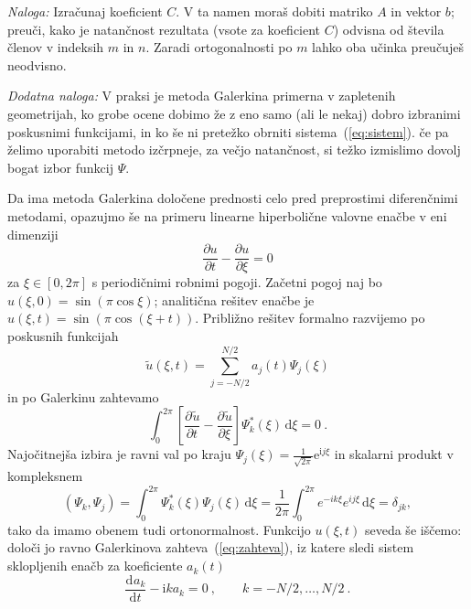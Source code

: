 \documentclass[slovene,11pt,a4paper]{article}
\newcommand{\dd}{\,\mathrm{d}}
\newcommand{\ddd}{\mathrm{d}}
\newcommand{\pd}{\partial}
\newcommand{\Dd}[3][{}]{\frac{\ddd^{#1} #2}{\ddd #3^{#1}}}
\newcommand{\Pd}[3][{}]{\frac{\pd^{#1} #2}{\pd #3^{#1}}}
\begin{document}
\bigskip

{\sl Naloga:} 
Izračunaj koeficient $C$.  V ta namen moraš dobiti matriko $A$
in vektor $b$; preuči, kako je natančnost rezultata
(vsote za koeficient $C$) odvisna od števila členov
v indeksih $m$ in $n$. Zaradi ortogonalnosti
po $m$ lahko oba učinka preučuješ neodvisno.

\bigskip

{\sl Dodatna naloga:}  V praksi je metoda Galerkina primerna
v zapletenih geometrijah, ko grobe ocene dobimo že z eno samo
(ali le nekaj) dobro izbranimi poskusnimi funkcijami,
in ko še ni pretežko obrniti sistema~(\ref{eq:sistem}).
če pa želimo uporabiti metodo izčrpneje,
za večjo natančnost, si težko izmislimo dovolj
bogat izbor funkcij $\Psi$.

Da ima metoda Galerkina določene prednosti celo pred preprostimi
diferenčnimi metodami, opazujmo še na primeru linearne hiperbolične
valovne enačbe v eni dimenziji
\begin{equation*}
  \frac{\partial u}{\partial t} - \frac{\partial u}{\partial \xi} = 0
\end{equation*}
za $\xi \in[0,2\pi]$ s periodičnimi robnimi pogoji.
Začetni pogoj naj bo $u(\xi,0)=\sin(\pi\cos \xi)$;
analitična rešitev enačbe je $u(\xi,t)=\sin(\pi\cos(\xi+t))$.
Približno rešitev formalno razvijemo po poskusnih funkcijah
\begin{equation}
  \widetilde{u}(\xi,t) = \sum_{j=-N/2}^{N/2} a_j(t) \Psi_j(\xi)
  \label{eq:razvoj}
\end{equation}
in po Galerkinu zahtevamo
\begin{equation}
\int_0^{2\pi} \left[ \Pd{\widetilde{u}}{t} -
  \Pd{\widetilde{u}}{\xi} \right] \Psi^*_k(\xi) \dd \xi = 0 \>.
\label{eq:zahteva}
\end{equation}
Najočitnejša izbira je ravni val po kraju $\Psi_j(\xi) = \frac{1}{\sqrt{2\pi}} \mathrm{e}^{\mathrm{i}j\xi}$ in 
skalarni produkt v kompleksnem 
\begin{equation}
 \left( \Psi_k, \Psi_j \right) = \int_{0}^{2\pi} \Psi^*_k(\xi) \Psi_j(\xi) \, \mathrm{d}\xi =  \frac{1}{2\pi} \int_{0}^{2\pi} e^{-i k \xi} e^{i j \xi} \, \mathrm{d}\xi = \delta_{jk},
\label{eq:skalarni}
\end{equation}
 tako da imamo
obenem tudi ortonormalnost.  Funkcijo $u(\xi,t)$ seveda še iščemo:
določi jo ravno Galerkinova zahteva~(\ref{eq:zahteva}), iz katere sledi
sistem sklopljenih enačb za koeficiente $a_k(t)$
\begin{equation}
\Dd{a_k}{t} - \mathrm{i}ka_k = 0 \>, \qquad
k = -N/2, \dots, N/2 \>.
\label{eq:koeficienti}
\end{equation}
\end{document}
